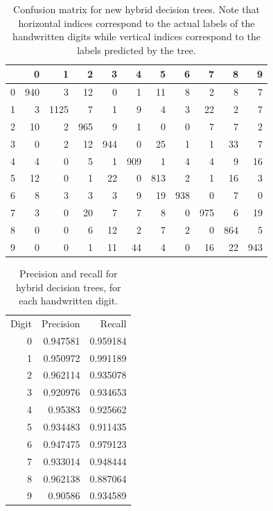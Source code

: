 \begin{table}
	\begin{tabular}{r|rrrrrrrrrr}
		&   0 &    1 &   2 &   3 &   4 &   5 &   6 &   7 &   8 &   9 \\
		\hline
		0 & 940 &    3 &  12 &   0 &   1 &  11 &   8 &   2 &   8 &   7 \\
		1 &   3 & 1125 &   7 &   1 &   9 &   4 &   3 &  22 &   2 &   7 \\
		2 &  10 &    2 & 965 &   9 &   1 &   0 &   0 &   7 &   7 &   2 \\
		3 &   0 &    2 &  12 & 944 &   0 &  25 &   1 &   1 &  33 &   7 \\
		4 &   4 &    0 &   5 &   1 & 909 &   1 &   4 &   4 &   9 &  16 \\
		5 &  12 &    0 &   1 &  22 &   0 & 813 &   2 &   1 &  16 &   3 \\
		6 &   8 &    3 &   3 &   3 &   9 &  19 & 938 &   0 &   7 &   0 \\
		7 &   3 &    0 &  20 &   7 &   7 &   8 &   0 & 975 &   6 &  19 \\
		8 &   0 &    0 &   6 &  12 &   2 &   7 &   2 &   0 & 864 &   5 \\
		9 &   0 &    0 &   1 &  11 &  44 &   4 &   0 &  16 &  22 & 943 \\
	\end{tabular}
	\caption{Confusion matrix for new hybrid decision trees.  Note that horizontal indices correspond to the actual labels of the handwritten digits while vertical indices correspond to the labels predicted by the tree.}
	\label{table:with_kd_confusion}
\end{table}

\begin{table}
	\centering
	\begin{tabular}{rrr}
		\hline
		Digit &   Precision &   Recall \\
		0 &    0.947581 & 0.959184 \\
		1 &    0.950972 & 0.991189 \\
		2 &    0.962114 & 0.935078 \\
		3 &    0.920976 & 0.934653 \\
		4 &    0.95383  & 0.925662 \\
		5 &    0.934483 & 0.911435 \\
		6 &    0.947475 & 0.979123 \\
		7 &    0.933014 & 0.948444 \\
		8 &    0.962138 & 0.887064 \\
		9 &    0.90586  & 0.934589 \\
	\end{tabular}
	\caption{Precision and recall for hybrid decision trees, for each handwritten digit.}
	\label{table:with_kd_precision_recall}
\end{table}

